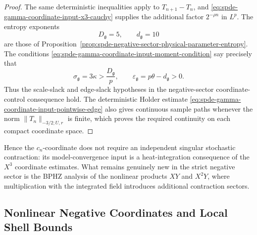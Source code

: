 \begin{proof}
The same deterministic inequalities apply to \(T_{n+1}-T_n\), and
\eqref{eq:spde-gamma-coordinate-input-x3-cauchy} supplies the additional
factor \(2^{-\rho n}\) in \(L^p\).  The entropy exponents
\[
  D_{\mathfrak g}=5,\qquad d_{\mathfrak g}=10
\]
are those of
Proposition~\ref{prop:spde-negative-sector-physical-parameter-entropy}.  The
conditions \eqref{eq:spde-gamma-coordinate-input-moment-condition} say
precisely that
\[
  \sigma_{\mathfrak g}=3\kappa>\frac{D_{\mathfrak g}}p,
  \qquad
  \varepsilon_{\mathfrak g}=p\theta-d_{\mathfrak g}>0 .
\]
Thus the scale-slack and edge-slack hypotheses in
the negative-sector coordinate-control consequence hold.
The deterministic Holder estimate
\eqref{eq:spde-gamma-coordinate-input-pointwise-edge} also gives continuous
sample paths whenever the norm \(\|T_n\|_{-3/2;U,r}\) is finite, which proves
the required continuity on each compact coordinate space.
\end{proof}

Hence the \(c_n\)-coordinate does not require an independent singular
stochastic contraction: its model-convergence input is a heat-integration
consequence of the \(X^3\) coordinate estimates.  What remains genuinely new
in the strict negative sector is the BPHZ analysis of the nonlinear products
\(XY\) and \(X^2Y\), where multiplication with the integrated field
introduces additional contraction sectors.

\subsection{Nonlinear Negative Coordinates and Local Shell Bounds}
\label{subsec:spde-nonlinear-negative-coordinates-shell-bounds}

